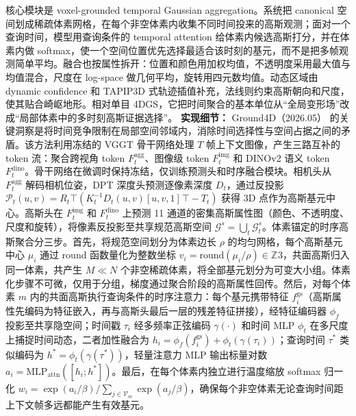 核心模块是 voxel-grounded temporal Gaussian aggregation。系统把 canonical 空间划成稀疏体素网格，在每个非空体素内收集不同时间投来的高斯观测；面对一个查询时间，模型用查询条件的 temporal attention 给体素内候选高斯打分，并在体素内做 softmax，使一个空间位置优先选择最适合该时刻的基元，而不是把多帧观测简单平均。融合也按属性拆开：位置和颜色用加权均值，不透明度采用最大值与均值混合，尺度在 log-space 做几何平均，旋转用四元数均值。动态区域由 dynamic confidence 和 TAPIP3D 式轨迹插值补充，法线则约束高斯朝向和尺度，使其贴合崎岖地形。相对单目 4DGS，它把时间聚合的基本单位从“全局变形场”改成“局部体素中的多时刻高斯证据选择”。
\textbf{实现细节：} Ground4D（2026.05） 的关键洞察是将时间竞争限制在局部空间邻域内，消除时间选择性与空间占据之间的矛盾。该方法利用冻结的 VGGT 骨干网络处理 $T$ 帧上下文图像，产生三路互补的 token 流：聚合跨视角 token $F_t^{\mathrm{agg}}$、图像级 token $F_t^{\mathrm{img}}$ 和 DINOv2 语义 token $F_t^{\mathrm{dino}}$。骨干网络在微调时保持冻结，仅训练预测头和时序融合模块。相机头从 $F_t^{\mathrm{agg}}$ 解码相机位姿，DPT 深度头预测逐像素深度 $D_t$，通过反投影 $\mathcal{P}_t(u,v) = R_t^{}\top(K_t^{-1}D_t(u,v)[u,v,1]^{}\top - T_t)$ 获得 3D 点作为高斯基元中心。高斯头在 $F_t^{\mathrm{img}}$ 和 $F_t^{\mathrm{dino}}$ 上预测 11 通道的密集高斯属性图（颜色、不透明度、尺度和旋转），将像素反投影至共享规范高斯空间 $\mathcal{G}^s = \bigcup_t \mathcal{G}_t^s$。体素锚定的时序高斯聚合分三步。首先，将规范空间划分为体素边长 $\rho$ 的均匀网格，每个高斯基元中心 $\mu_i$ 通过 round 函数量化为整数坐标 $v_i = \mathrm{round}(\mu_i / \rho) \in \mathbb{Z}^{}3$，共面高斯归入同一体素，共产生 $M \ll N$ 个非空稀疏体素，将全部基元划分为可变大小组。体素化步骤不可微，仅用于分组，梯度通过聚合阶段的高斯属性回传。然后，对每个体素 $m$ 内的共面高斯执行查询条件的时序注意力：每个基元携带特征 $f_i^{\mathrm{gs}}$（高斯属性先编码为特征嵌入，再与高斯头最后一层的残差特征拼接），经特征编码器 $\phi_f$ 投影至共享隐空间；时间戳 $\tau_i$ 经多频率正弦编码 $\gamma(\cdot)$ 和时间 MLP $\phi_t$ 在多尺度上捕捉时间动态，二者加性融合为 $h_i = \phi_f(f_i^{\mathrm{gs}}) + \phi_t(\gamma(\tau_i))$；查询时间 $\tau^{*}$ 类似编码为 $h^{*} = \phi_t(\gamma(\tau^{*}))$，轻量注意力 MLP 输出标量对数 $a_i = \mathrm{MLP}_{\mathrm{attn}}([h_i; h^{*}])$。最后，在每个体素内独立进行温度缩放 softmax 归一化 $w_i = \exp(a_i/\beta) / \sum_{j \in \mathcal{V}_m}\exp(a_j/\beta)$，确保每个非空体素无论查询时间距上下文帧多远都能产生有效基元。
